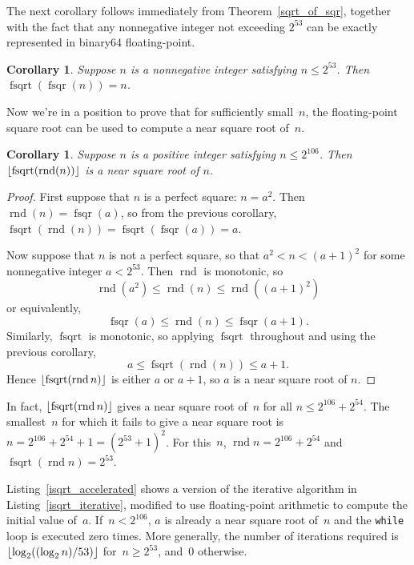 \documentclass[a4paper]{article}
\DeclarePairedDelimiter\floor{\lfloor}{\rfloor}
\DeclareMathOperator{\rnd}{rnd}
\DeclareMathOperator{\fsqrt}{fsqrt}
\DeclareMathOperator{\fsqr}{fsqr}
\theoremstyle{plain}
\newtheorem{corollary}[theorem]{Corollary}
\theoremstyle{definition}
\begin{document}
The next corollary follows immediately from Theorem~\ref{sqrt_of_sqr}, together
with the fact that any nonnegative integer not exceeding $2^{53}$ can be
exactly represented in binary64 floating-point.

\begin{corollary}
  Suppose $n$ is a nonnegative integer satisfying $n \le 2^{53}$. Then
  $\fsqrt(\fsqr(n)) = n$.
\end{corollary}

Now we're in a position to prove that for sufficiently small~$n$, the
floating-point square root can be used to compute a near square root of~$n$.

\begin{corollary}
  Suppose $n$ is a positive integer satisfying $n \le 2^{106}$. Then
  $\floor{\fsqrt(\rnd(n))}$ is a near square root of $n$.
\end{corollary}

\begin{proof}
  First suppose that $n$ is a perfect square: $n = a^2$. Then $\rnd(n) =
  \fsqr(a)$, so from the previous corollary, $\fsqrt(\rnd(n)) =
  \fsqrt(\fsqr(a)) = a$.

  Now suppose that $n$ is not a perfect square, so that $a^2 < n < (a+1)^2$
  for some nonnegative integer $a < 2^{53}$. Then $\rnd$ is monotonic, so
    $$\rnd(a^2) \le \rnd(n) \le \rnd((a+1)^2)$$
  or equivalently,
    $$\fsqr(a) \le \rnd(n) \le \fsqr(a+1).$$
  Similarly, $\fsqrt$ is monotonic, so applying $\fsqrt$ throughout
  and using the previous corollary,
    $$a \le \fsqrt(\rnd(n)) \le a + 1.$$
  Hence $\floor{\fsqrt(\rnd n)}$ is either $a$ or $a+1$, so $a$ is a near
  square root of $n$.
\end{proof}

In fact, $\floor{\fsqrt(\rnd n)}$ gives a near square root of~$n$ for all $n
\le 2^{106} + 2^{54}$. The smallest~$n$ for which it fails to give a near
square root is $n = 2^{106} + 2^{54} + 1 = (2^{53} + 1)^2$. For this~$n$, $\rnd
n = 2^{106} + 2^{54}$ and $\fsqrt(\rnd n) = 2^{53}$.

Listing~\ref{isqrt_accelerated} shows a version of the iterative
algorithm in Listing~\ref{isqrt_iterative}, modified to use floating-point
arithmetic to compute the initial value of~$a$.  If~$n < 2^{106}$,
$a$ is already a near square root of~$n$ and the \lstinline$while$ loop is
executed zero times. More generally, the number of iterations required
is~$\floor{\log_2((\log_2n)/53)}$ for~$n \ge 2^{53}$, and~$0$ otherwise.
\end{document}
